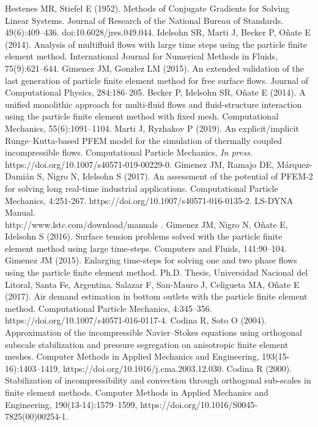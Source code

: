  Hestenes MR, Stiefel E (1952). Methods of Conjugate Gradients for Solving Linear Systems. Journal of Research of the National Bureau of Standards. 49(6):409--436. doi:10.6028/jres.049.044.
 Idelsohn SR, Marti J, Becker P, O\~nate E (2014). Analysis of multifluid flows with large time steps using the particle finite element method. International Journal for Numerical Methods in Fluids, 75(9):621--644.
 Gimenez JM, Gonzlez LM (2015). An extended validation of the last generation of particle finite element method for free surface flows. Journal of Computational Physics, 284:186--205.
 Becker P, Idelsohn SR, O\~nate E (2014). A unified monolithic approach for multi-fluid flows and fluid-structure interaction using the particle finite element method with fixed mesh. Computational Mechanics, 55(6):1091--1104.
 Marti J, Ryzhakov P (2019). An explicit/implicit Runge--Kutta-based PFEM model for the simulation of thermally coupled incompressible flows. Computational Particle Mechanics, {\sl In press}. https://doi.org/10.1007/s40571-019-00229-0.
 Gimenez JM, Ramajo DE, M\'arquez-Dami\'an S, Nigro N, Idelsohn S (2017). An assessment of the potential of PFEM-2 for solving long real-time industrial applications. Computational Particle Mechanics, 4:251-267. https://doi.org/10.1007/s40571-016-0135-2.
 LS-DYNA Manual.\\
http://www.lstc.com/download/manuals .
 Gimenez JM, Nigro N, O\~nate E, Idelsohn S (2016). Surface tension problems solved with the particle finite element method using large time-steps. Computers and Fluids, 141:90--104.
 Gimenez JM (2015). Enlarging time-steps for solving one and two phase flows using the particle finite element method. Ph.D. Thesis, Universidad Nacional del Litoral, Santa Fe, Argentina.
 Salazar F, San-Mauro J, Celigueta MA, O\~nate E (2017). Air demand estimation in bottom outlets with the particle finite element method. Computational Particle Mechanics, 4:345--356. https://doi.org/10.1007/s40571-016-0117-4.
 Codina R, Soto O (2004). Approximation of the incompressible Navier–Stokes equations using orthogonal subscale stabilization and pressure segregation on anisotropic finite element meshes. Computer Methods in Applied Mechanics and Engineering, 193(15-16):1403--1419, https://doi.org/10.1016/j.cma.2003.12.030.
 Codina R (2000). Stabilization of incompressibility and convection through orthogonal sub-scales in finite element methods. Computer Methods in Applied Mechanics and Engineering, 190(13-14):1579--1599, https://doi.org/10.1016/S0045-7825(00)00254-1.
